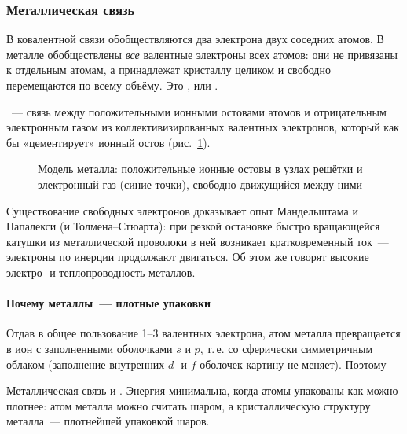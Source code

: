 \subsubsection{Металлическая связь}

В ковалентной связи обобществляются два электрона двух соседних атомов.
В металле обобществлены \emph{все} валентные электроны всех атомов: они не
привязаны к отдельным атомам, а принадлежат кристаллу целиком и
свободно перемещаются по всему объёму. Это ,
или .

\begin{opredelenie}
~— связь между положительными ионными остовами
атомов и отрицательным электронным газом из коллективизированных
валентных электронов, который как бы «цементирует» ионный остов
(рис.~\ref{fig:metal-bond}).
\end{opredelenie}

\begin{figure}[ht]
\centering
{}
\caption{Модель металла: положительные ионные остовы в узлах решётки и
электронный газ (синие точки), свободно движущийся между ними}
\label{fig:metal-bond}
\end{figure}

Существование свободных электронов доказывает опыт Мандельштама и
Папалекси (и Толмена--Стюарта): при резкой остановке быстро вращающейся
катушки из металлической проволоки в ней возникает кратковременный ток~—
электроны по инерции продолжают двигаться. Об этом же говорят высокие
электро- и теплопроводность металлов.

\paragraph{Почему металлы~— плотные упаковки}
Отдав в общее пользование 1--3 валентных электрона, атом металла
превращается в ион с заполненными оболочками $s$ и $p$, т.\,е. со
сферически симметричным облаком (заполнение внутренних $d$- и
$f$-оболочек картину не меняет). Поэтому
\begin{glavnoe}
Металлическая связь  и .
Энергия минимальна, когда атомы упакованы как можно плотнее: атом
металла можно считать шаром, а кристаллическую структуру металла~—
плотнейшей упаковкой шаров.
\end{glavnoe}

